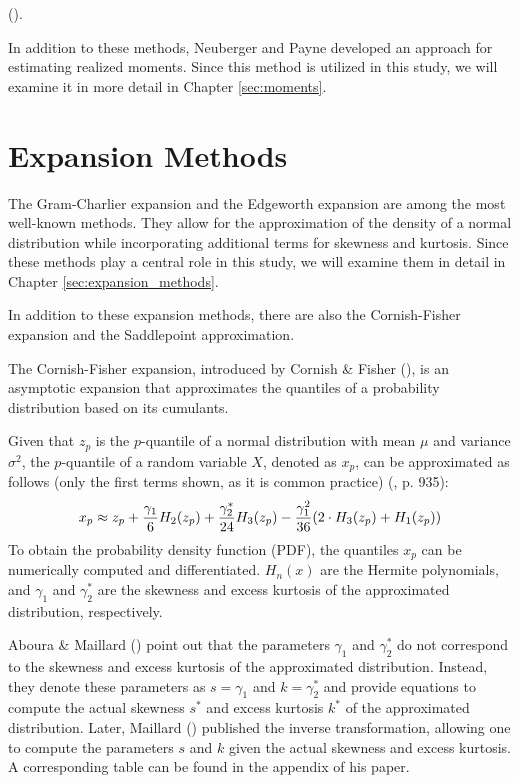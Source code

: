 (\citeyear{amayaDoesRealizedSkewness2015}). 

In addition to these methods, Neuberger and Payne developed an approach for estimating realized moments. Since this method is utilized in this study, we will examine it in more detail in Chapter \ref{sec:moments}.

\section{Expansion Methods}

The Gram-Charlier expansion and the Edgeworth expansion are among the most well-known methods. They allow for the approximation of the density of a normal distribution while incorporating additional terms for skewness and kurtosis. Since these methods play a central role in this study, we will examine them in detail in Chapter \ref{sec:expansion_methods}.

In addition to these expansion methods, there are also the Cornish-Fisher expansion and the Saddlepoint approximation.

The Cornish-Fisher expansion, introduced by Cornish \& Fisher (\citeyear{cornishMomentsCumulantsSpecification1938}), is an asymptotic expansion that approximates the quantiles of a probability distribution based on its cumulants.

Given that $z_p$ is the $p$-quantile of a normal distribution with mean $\mu$ and variance $\sigma^2$, the $p$-quantile of a random variable $X$, denoted as $x_p$, can be approximated as follows (only the first terms shown, as it is common practice) (\cite{abramowitzHandbookMathematicalFunctions1968}, p. 935):
\begin{align}
    x_p \approx z_p + \frac{\gamma_1}{6}H_2(z_p) + \frac{\gamma_2^*}{24}H_3(z_p) - \frac{\gamma_1^2}{36}(2\cdot H_3(z_p) + H_1(z_p)) \notag
\end{align}
To obtain the probability density function (PDF), the quantiles $x_p$ can be numerically computed and differentiated. $H_n(x)$ are the Hermite polynomials, and $\gamma_1$ and $\gamma_2^*$ are the skewness and excess kurtosis of the approximated distribution, respectively.

Aboura \& Maillard (\citeyear{abouraOptionPricingSkewness2016}) point out that the parameters $\gamma_1$ and $\gamma_2^*$ do not correspond to the skewness and excess kurtosis of the approximated distribution. Instead, they denote these parameters as $s = \gamma_1$ and $k = \gamma_2^*$ and provide equations to compute the actual skewness $s^*$ and excess kurtosis $k^*$ of the approximated distribution. Later, Maillard (\citeyear{maillardUserGuideCornish2018}) published the inverse transformation, allowing one to compute the parameters $s$ and $k$ given the actual skewness and excess kurtosis. A corresponding table can be found in the appendix of his paper.

